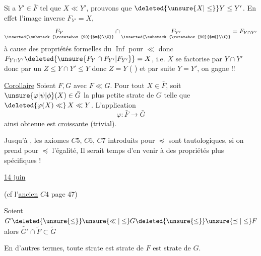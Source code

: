Si  a $Y'\in\bar F$ tel que $X\ll Y'$, prouvons que $\deleted{\unsure{X|\leq}}Y\leq Y'$.  En  effet l'image inverse $F_{Y'}=X$, 
\[
 \underset{\inserted{\substack{\rotatebox{90}{$=$}\\X}}}{F_Y}\cap
 \underset{\inserted{\substack{\rotatebox{90}{$=$}\\X}}}{F_{Y'}}=F_{Y\cap Y'}
\]
à cause des propriétés formelles du $\operatorname{Inf}$ pour $\ll$ donc $F_{Y\cap Y'}\deleted{\unsure{F_Y\cap F_{Y'}|F_{Y'}}}=X$, i.e. $X$ se factorise par $Y\cap Y'$ donc par un $Z\leq Y\cap Y'\leq Y$ donc $Z=Y$ ( ) et par suite $Y=Y'$, on gagne !!

\uline{Corollaire} Soient $F,G$ avec $F\ll G$. Pour tout $X\in\bar F$, soit $\unsure{\varphi|\psi|\phi}(X)\in\bar G$ la plus petite strate  de $G$ telle que $\deleted{\varphi(X)\ll}\,X\ll Y$. L'application
\[
 \varphi:\bar F\longrightarrow\bar G
\]
ainsi obtenue est \uline{croissante} (trivial).

Jusqu'à , les axiomes  $C5$, $C6$, $C7$ introduits pour $\preceq$ sont tautologiques, si on prend pour $\preceq$ l'égalité,  Il serait temps d'en venir à des propriétés  plus spécifiques !

\uline{14 juin}


  (cf l'\uline{ancien} $C4$  page 47)

Soient $G'\deleted{\unsure{\leq}}\unsure{\ll|\leq}G\deleted{\unsure{\leq}}\unsure{\preceq|\leq}F$ alors $\widetilde{G'}\cap\widetilde F\subset\widetilde G$

En d'autres termes, toute strate    est strate de $F$ est strate de $G$.

